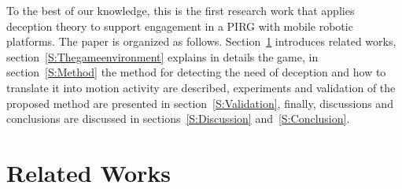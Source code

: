 To the best of our knowledge, this is the first research work that applies deception theory to support engagement in a PIRG with mobile robotic platforms. 
The paper is organized as follows. Section~\ref{S:RelatedWorks} introduces related works, section~\ref{S:Thegameenvironment} explains in details the game, in section~\ref{S:Method} the method for detecting the need of deception and how to translate it into motion activity are described, experiments and validation of the proposed method are presented in section~\ref{S:Validation}, finally, discussions and conclusions are discussed in sections~\ref{S:Discussion} and~\ref{S:Conclusion}.

\section{Related Works}
\label{S:RelatedWorks}

